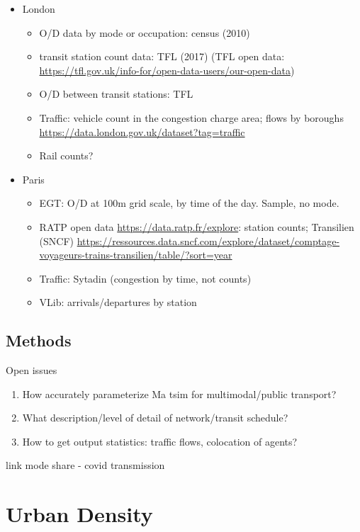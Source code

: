 \documentclass[10pt]{article}
\begin{document}
\begin{itemize}
	\item London
	\begin{itemize}
		\item O/D data by mode or occupation: census (2010)
		\item transit station count data: TFL (2017) (TFL open data: \url{https://tfl.gov.uk/info-for/open-data-users/our-open-data})
		\item O/D between transit stations: TFL
		\item Traffic: vehicle count in the congestion charge area; flows by boroughs \url{https://data.london.gov.uk/dataset?tag=traffic}
		\item Rail counts?
	\end{itemize}
	\item Paris
	\begin{itemize}
		\item EGT: O/D at 100m grid scale, by time of the day. Sample, no mode.
		\item RATP open data \url{https://data.ratp.fr/explore}: station counts; Transilien (SNCF) \url{https://ressources.data.sncf.com/explore/dataset/comptage-voyageurs-trains-transilien/table/?sort=year}
		\item Traffic: Sytadin (congestion by time, not counts)
		\item VLib: arrivals/departures by station
	\end{itemize}
\end{itemize}

\subsection{Methods}

Open issues
\begin{enumerate}
	\item How accurately parameterize Ma	tsim for multimodal/public transport?
	\item What description/level of detail of network/transit schedule?
	\item How to get output statistics: traffic flows, colocation of agents?
\end{enumerate}




\cite{chen2021effects} link mode share - covid transmission


	
\section{Urban Density}
\end{document}
